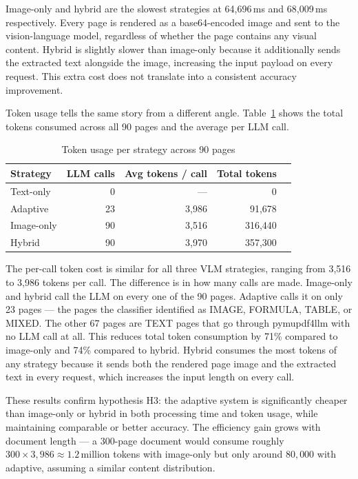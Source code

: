 Image-only and hybrid are the slowest strategies at 64{,}696\,ms and
68{,}009\,ms respectively. Every page is rendered as a base64-encoded image
and sent to the vision-language model, regardless of whether the page
contains any visual content. Hybrid is slightly slower than image-only
because it additionally sends the extracted text alongside the image,
increasing the input payload on every request. This extra cost does not
translate into a consistent accuracy improvement.

Token usage tells the same story from a different angle.
Table~\ref{tab:tokens} shows the total tokens consumed across all 90 pages
and the average per LLM call.

\begin{table}[ht]
\centering
\caption{Token usage per strategy across 90 pages}
\label{tab:tokens}
\renewcommand{\arraystretch}{1.4}
\begin{tabular}{lrrrr}
\toprule
\textbf{Strategy} & \textbf{LLM calls} & \textbf{Avg tokens / call} & \textbf{Total tokens} \\
\midrule
Text-only  & 0  & ---     & 0       \\
Adaptive   & 23 & 3{,}986 & 91{,}678  \\
Image-only & 90 & 3{,}516 & 316{,}440 \\
Hybrid     & 90 & 3{,}970 & 357{,}300 \\
\bottomrule
\end{tabular}
\end{table}

The per-call token cost is similar for all three VLM strategies, ranging
from 3{,}516 to 3{,}986 tokens per call. The difference is in how many
calls are made. Image-only and hybrid call the LLM on every one of the
90 pages. Adaptive calls it on only 23 pages --- the pages the classifier
identified as IMAGE, FORMULA, TABLE, or MIXED. The other 67 pages are
TEXT pages that go through pymupdf4llm with no LLM call at all.
This reduces total token consumption by 71\% compared to image-only and
74\% compared to hybrid. Hybrid consumes the most tokens of any strategy
because it sends both the rendered page image and the extracted text in
every request, which increases the input length on every call.

These results confirm hypothesis H3: the adaptive system is significantly
cheaper than image-only or hybrid in both processing time and token usage,
while maintaining comparable or better accuracy. The efficiency gain grows
with document length --- a 300-page document would consume roughly
$300 \times 3{,}986 \approx 1.2$\,million tokens with image-only but only
around $80{,}000$ with adaptive, assuming a similar content distribution.

